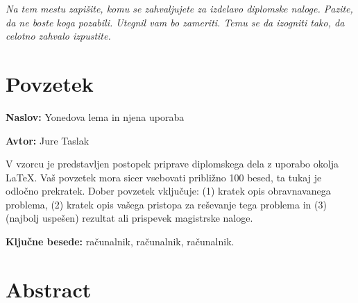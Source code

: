 \documentclass[12pt,a4paper]{book}
\newcommand{\ttitle}{Yonedova lema in njena uporaba}
\newcommand{\tauthor}{Jure Taslak}
\newcommand{\tkeywords}{računalnik, računalnik, računalnik}
\newcommand{\clearemptydoublepage}{\newpage{\pagestyle{empty}\cleardoublepage}}
\theoremstyle{definition}
\theoremstyle{plain}
\theoremstyle{definition}
\theoremstyle{remark}
\begin{document}
\vspace{2cm}

\clearemptydoublepage

\thispagestyle{empty}\mbox{}\vfill\null\it%
\noindent
Na tem mestu zapišite, komu se zahvaljujete za izdelavo diplomske naloge. Pazite, da ne boste koga pozabili. Utegnil vam bo zameriti. Temu se da izogniti tako, da celotno zahvalo izpustite.
\rm\normalfont

\clearemptydoublepage

\thispagestyle{empty}\mbox{}{\textheight}\mbox{}\hfill\begin{minipage}{0.55\textwidth}%

\normalfont\end{minipage}

\clearemptydoublepage


\pagestyle{empty}
\def\thepage{}%
\tableofcontents{}

\clearemptydoublepage


\chapter*{Povzetek}

\noindent\textbf{Naslov:} \ttitle
\bigskip

\noindent\textbf{Avtor:} \tauthor
\bigskip

\noindent V vzorcu je predstavljen postopek priprave diplomskega dela z uporabo okolja \LaTeX. Vaš povzetek mora sicer vsebovati približno 100 besed, ta tukaj je odločno prekratek.
Dober povzetek vključuje: (1) kratek opis obravnavanega problema, (2) kratek opis vašega pristopa za reševanje tega problema in (3) (najbolj uspešen) rezultat ali prispevek magistrske naloge.

\bigskip

\noindent\textbf{Ključne besede:} \tkeywords.
\clearemptydoublepage

\chapter*{Abstract}
\end{document}
